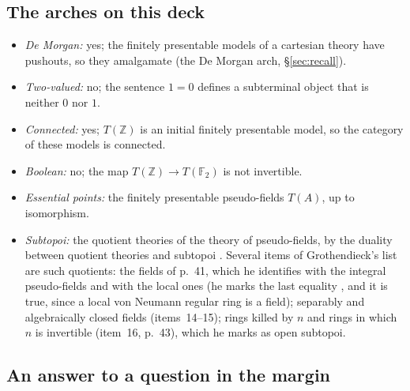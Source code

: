 \subsection{The arches on this deck}

\begin{itemize}
\item \emph{De Morgan:} yes; the finitely presentable models of a cartesian theory have pushouts, so they amalgamate (the De Morgan arch, \S\ref{sec:recall}).
\item \emph{Two-valued:} no; the sentence $1=0$ defines a subterminal object that is neither $0$ nor $1$.
\item \emph{Connected:} yes; $T(\mathbb Z)$ is an initial finitely presentable model, so the category of these models is connected.
\item \emph{Boolean:} no; the map $T(\mathbb Z)\to T(\mathbb F_2)$ is not invertible.
\item \emph{Essential points:} the finitely presentable pseudo-fields $T(A)$, up to isomorphism.
\item \emph{Subtopoi:} the quotient theories of the theory of pseudo-fields, by the duality between quotient theories and subtopoi \cite{caramello-tst}. Several items of Grothendieck's list are such quotients: the fields of p.~41, which he identifies with the integral pseudo-fields and with the local ones (he marks the last equality , and it is true, since a local von Neumann regular ring is a field); separably and algebraically closed fields (items~14--15); rings killed by $n$ and rings in which $n$ is invertible (item~16, p.~43), which he marks as open subtopoi.
\end{itemize}

\subsection{An answer to a question in the margin}

